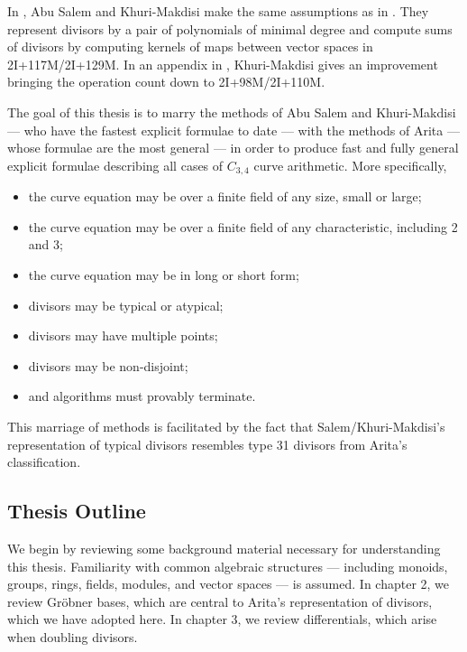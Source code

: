 In \cite{salem07}, Abu Salem and Khuri-Makdisi make the same assumptions as in \cite{flon08}.
They represent divisors by a pair of polynomials of minimal degree and compute sums of divisors
by computing kernels of maps between vector spaces in 2I+117M/2I+129M.
In an appendix in \cite{kmakdisi18},
Khuri-Makdisi gives an improvement bringing the operation count down to 2I+98M/2I+110M.

The goal of this thesis is to marry the methods of Abu Salem and Khuri-Makdisi ---
who have the fastest explicit formulae to date ---
with the methods of Arita --- whose formulae are the most general ---
in order to produce fast and fully general explicit formulae describing all cases of $C_{3,4}$ curve arithmetic.
More specifically,
\begin{itemize}
  \item the curve equation may be over a finite field of any size, small or large;
  \item the curve equation may be over a finite field of any characteristic, including 2 and 3;
  \item the curve equation may be in long or short form;
  \item divisors may be typical or atypical;
  \item divisors may have multiple points;
  \item divisors may be non-disjoint;
  \item and algorithms must provably terminate.
\end{itemize}
This marriage of methods is facilitated by the fact that Salem/Khuri-Makdisi's representation of typical divisors resembles type 31 divisors from Arita's classification.




\subsection{Thesis Outline}

We begin by reviewing some background material necessary for understanding this thesis.
Familiarity with common algebraic structures ---
including monoids, groups, rings, fields, modules, and vector spaces --- is assumed.
In chapter 2, we review Gr\"obner bases,
which are central to Arita's representation of divisors,
which we have adopted here.
In chapter 3, we review differentials, which arise when doubling divisors.

